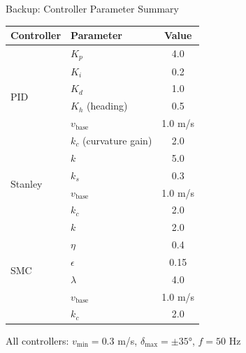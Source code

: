 \documentclass[10pt]{beamer}
\begin{document}
\begin{frame}{Backup: Controller Parameter Summary}
  \begin{table}
    \centering
    \tiny
    \begin{tabular}{llc}
      \toprule
      \textbf{Controller} & \textbf{Parameter} & \textbf{Value} \\
      \midrule
      \multirow{6}{*}{PID} & $K_p$ & 4.0 \\
                           & $K_i$ & 0.2 \\
                           & $K_d$ & 1.0 \\
                           & $K_h$ (heading) & 0.5 \\
                           & $v_{\text{base}}$ & 1.0 m/s \\
                           & $k_c$ (curvature gain) & 2.0 \\
      \midrule
      \multirow{4}{*}{Stanley} & $k$ & 5.0 \\
                               & $k_s$ & 0.3 \\
                               & $v_{\text{base}}$ & 1.0 m/s \\
                               & $k_c$ & 2.0 \\
      \midrule
      \multirow{6}{*}{SMC} & $k$ & 2.0 \\
                           & $\eta$ & 0.4 \\
                           & $\epsilon$ & 0.15 \\
                           & $\lambda$ & 4.0 \\
                           & $v_{\text{base}}$ & 1.0 m/s \\
                           & $k_c$ & 2.0 \\
      \bottomrule
    \end{tabular}
  \end{table}

  All controllers: $v_{\min} = 0.3$ m/s, $\delta_{\max} = \pm 35°$, $f = 50$ Hz
\end{frame}
\end{document}
